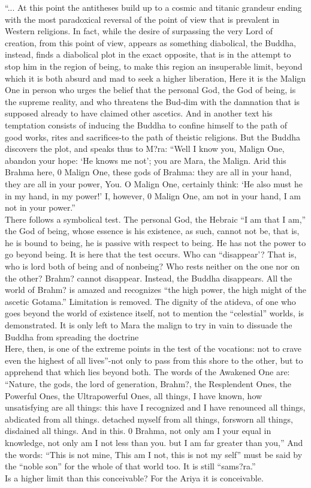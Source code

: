 \begin{footnotesize}
\begin{sffamily}
``... At this point the antitheses build up to a cosmic and titanic grandeur ending with the most paradoxical reversal of the point of view that is prevalent in Western reli\-gions. In fact, while the desire of surpassing the very Lord of creation, from this point of view, appears as something diabolical, the Buddha, instead, finds a diabolical plot in the exact opposite, that is in the attempt to stop him in the region of being, to make this region an insuperable limit, beyond which it is both absurd and mad to seek a higher liberation, Here it is the Malign One in person who urges the belief that the personal God, the God of being, is the supreme reality, and who threatens the Bud-dim with the damnation that is supposed already to have claimed other ascetics. And in another text his temptation consists of inducing the Buddha to confine himself to the path of good works, rites and sacrifices-to the path of theistic religions. But the Buddha discovers the plot, and speaks thus to M?ra: ``Well I know you, Malign One, abandon your hope: `He knows me not'; you are Mara, the Malign. Arid this Brahma here, 0 Malign One, these gods of Brahma: they are all in your hand, they are all in your power, You. O Malign One, certainly think: `He also must he in my hand, in my power!' I, however, 0 Malign One, am not in your hand, I am not in your power.''\\ There follows a symbolical test. The personal God, the Hebraic ``I am that I am,'' the God of being, whose essence is his existence, as such, cannot not be, that is, he is bound to being, he is passive with respect to being. He has not the power to go beyond being. It is here that the test occurs. Who can ``disappear'? That is, who is lord both of being and of nonbeing? Who rests neither on the one nor on the other? Brahm? cannot disappear. Instead, the Buddha disappears. All the world of Brahm? is amazed and recognizes ``the high power, the high might of the ascetic Gotama.'' Limitation is removed. The dignity of the atideva, of one who goes beyond the world of existence itself, not to mention the ``celestial'' worlds, is demonstrated. It is only left to Mara the malign to try in vain to dissuade the Buddha from spreading the doctrine\\ Here, then, is one of the extreme points in the test of the vocations: not to crave even the highest of all lives''-not only to pass from this shore to the other, but to apprehend that which lies beyond both. The words of the Awakened One are: ``Na\-ture, the gods, the lord of generation, Brahm?, the Resplendent Ones, the Powerful Ones, the Ultrapowerful Ones, all things, I have known, how unsatisfying are all things: this have I recognized and I have renounced all things, abdicated from all things. detached myself from all things, forsworn all things, disdained all things. And in this. 0 Brahma, not only am I your equal in knowledge, not only am I not less than you. but I am far greater than you,'' And the words: ``This is not mine, This am I not, this is not my self'' must be said by the ``noble son'' for the whole of that world too. It is still ``sams?ra.''\\ Is a higher limit than this conceivable? For the Ariya it is conceivable. 
\end{sffamily}
\end{footnotesize}
